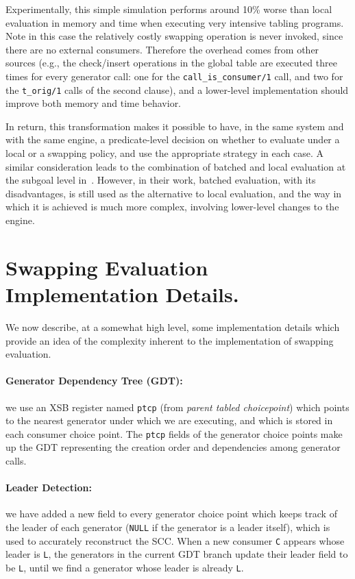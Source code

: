 \documentclass{./tlp}
\newcommand{\redsect}{\vspace{-1em}}
\begin{document}
Experimentally, this simple simulation performs around 10\% worse than
local evaluation in memory and time when executing very intensive
tabling programs.  Note in this case the relatively costly swapping
operation is never invoked, since there are no external consumers.
Therefore the overhead comes from other sources (e.g., the
check/insert operations in the global table are executed three times
for every generator call: one for the \lstinline{call_is_consumer/1}
call, and two for the \lstinline{t_orig/1} calls of the second
clause), and 
a lower-level implementation should improve both memory and
time behavior.

In return, this transformation makes it possible to have, in the same
system and with the same engine, a predicate-level decision on whether
to evaluate under a local or a swapping policy, and use the
appropriate strategy in each case.  A similar consideration leads to
the combination of batched and local evaluation at the subgoal level
in~\cite{iclp/RochaSC05}.  However, in their work, batched evaluation,
with its disadvantages, is still used as the alternative to local
evaluation, and the way in which it is achieved is much more complex,
involving lower-level changes to the engine.





  
\redsect
\section{Swapping Evaluation Implementation Details.} 
\label{sec:impl-details} 

We now describe, at a somewhat high level, some implementation
details which provide an idea of the complexity inherent to the
implementation of swapping evaluation.


\redsect
\paragraph{\textbf{Generator Dependency Tree (GDT):} }
we use an XSB register named \lstinline{ptcp} (from \emph{parent
  tabled choicepoint}) which points to the nearest generator under
which we are executing, and which is stored in each consumer
choice point.  The \lstinline{ptcp} fields of the generator choice
points make up the GDT representing the creation order and
dependencies among generator calls.

\redsect
\paragraph{\textbf{Leader Detection:}}
we have added a new field to every generator choice point which keeps
track of the leader of each generator (\lstinline{NULL} if the
generator is a leader itself), which is used to accurately reconstruct
the SCC.  When a new consumer \lstinline{C} appears whose leader is
\lstinline{L}, the generators in the current GDT branch
update their leader field to be \lstinline{L}, until we
find a generator whose leader is already \lstinline{L}.
\end{document}
